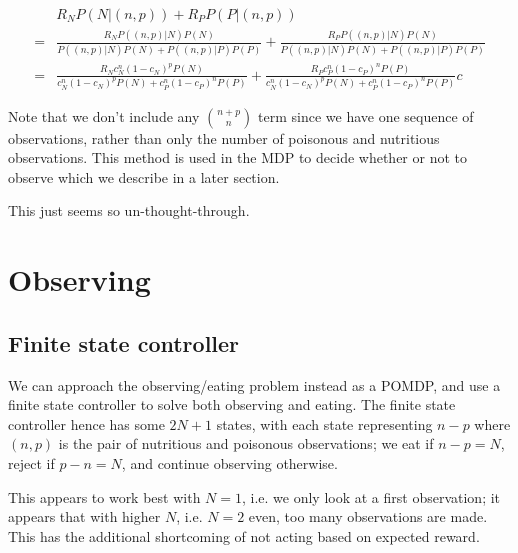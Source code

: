 \documentclass{article}
\begin{document}
\begin{align*}
  &R_N P(N|(n,p)) +R_P  P(P|(n,p))\\
  =&\frac{R_NP((n,p)|N) P(N)}{P((n,p)|N)P(N)+P((n,p)|P)P(P)} + \frac{R_PP((n,p)|N)P(N)}{P((n,p)|N)P(N)+P((n,p)|P)P(P)}\\
  =&\frac{R_Nc_N^n(1-c_N)^p P(N)}{ c_N^n(1-c_N)^p P(N) +  c_P^n(1-c_P)^n P(P)} + \frac{R_P c_P^n(1-c_P)^n P(P) }{ c_N^n(1-c_N)^p P(N)+c_P^n(1-c_P)^n P(P)}c
\end{align*}

Note that we don't include any ${n+p\choose n}$ term since we have one
sequence of observations, rather than only the number of poisonous and nutritious
observations. 
This method is used in the MDP to decide whether or not to observe
which we describe in a later section. 

This just seems so un-thought-through. 

\section{Observing}
\subsection{Finite state controller}
We can approach the observing/eating problem instead as a POMDP,
and use a finite state controller to solve both observing and eating.
The finite state controller hence has some $2N+1$ states, with
each state representing $n-p$ where $(n,p)$ is the pair of  nutritious
and poisonous observations; we eat if $n-p=N$, reject if $p-n=N$, and
continue observing otherwise. 

This appears to work best with $N=1$, i.e. we only look at a first
observation; it appears that with higher $N$, i.e. $N=2$ even, too many
observations are made.
This has the additional shortcoming of not acting based on expected reward.

\\


\end{document}
